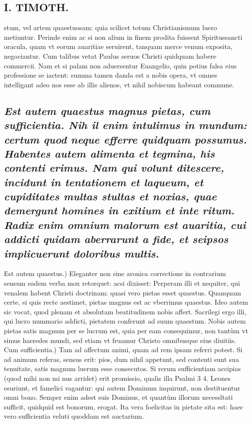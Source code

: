 \documentclass{article}
\begin{document}
\begin{pages}
\section*{I. TIMOTH. }
\marginpar{[ p.76 ]}\pstart stum, vel artem quaestuosam: quia scilicet totum Christianismum luero metiuntur. Perinde enim ac si non alium in finem prodita fuissent Spiritussancti oracula, quam vt eorum auaritiae seruirent, tanquam merce venum exposita, negociantur. Cum talibus vetat Paulus seruos Christi quidquam habere commercii. Nam et si palam non aduersentur Euangelio, quin potius falsa eius professione se iactent: summa tamen danda est a nobis opera, vt omnes intelligant adeo nos esse ab illis alienos, vt nihil nobiscum habeant commune.  \pend
{}
{}
\subsection*{\textit{Est autem quaestus magnus pietas, cum sufficientia. Nih il enim intulimus in mundum: certum quod neque efferre quidquam possumus. Habentes autem alimenta et tegmina, his contenti erimus. Nam qui volunt ditescere, incidunt in tentationem et laqueum, et cupiditates multas stultas et noxias, quae demergunt homines in exitium et inte ritum. Radix enim omnium malorum est auaritia, cui addicti quidam aberrarunt a fide, et seipsos implicuerunt doloribus multis. }}\pstart Est autem quaestus.) Eleganter non sine aronica correctione in contrarium sensum eadem verba mox retorquet: acsi dixisset: Perperam illi et nequiter, qui venalem habent Christi doctrinam: quasi vero pietas esset quaestus. Quanquam certe, si quis recte aestimet, pietas magnus est ac vberrimus quaestus. Ideo autem sic vocat, quod plenam et absolutam beatitudinem nobis affert. Sacrilegi ergo illi, qui lucro nummario addicti, pietatem conferunt ad suum quaestum. Nobis autem pietas satis magnum per se lucrum est, quia per eam consequimur, non tantùm vt simus haeredes mundi, sed etiam vt fruamur Christo omnibusque eius diuitiis.  \pend\pstart Cum sufficientia.) Tam ad affectum animi, quam ad rem ipsam referri potest. Si ad animum referas, sensus erit: pios, dum nihil appetunt, sed contenti sunt sua tenuitate, satis magnum luerum esse consecutos. Si rerum sufficientiam accipias (quod mihi non mi nus arridet) erit promissio, qualis illa Psalmi 3 4. Leones esuriunt, et famelici vagantur: qui autem Dominum inquirunt, non destituentur omni bono. Semper enim adest suis Dominus, et quantùm illorum necessĩtati sufficit, quidquid est bonorum, erogat. Ita vera foelicitas in pietate sita est: haec vero sufficientia veluti quoddam est auctarium.  \pend

\end{pages}
\end{document}
